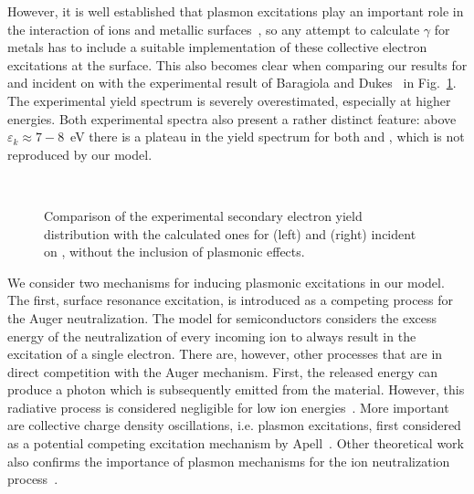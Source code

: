 \begin{refsection}
However, it is well established that plasmon excitations play an important 
role in the interaction of ions and metallic surfaces~\cite{Baragiola1996, 
Baragiola2001, Baragiola2007}, so any attempt to calculate $\gamma$ for metals 
has to include a suitable implementation of these collective electron excitations at
the surface. This also becomes clear when comparing our results 
for  and  incident on  with the experimental 
result of Baragiola and Dukes~\cite{Baragiola1996} in 
Fig.~\ref{quotas:fig-he_mg_noplasmon}. The experimental yield spectrum is 
severely overestimated, especially at higher energies. Both experimental 
spectra also present a rather distinct feature: above $\varepsilon_k \approx 
7-8$~\si{\electronvolt} there is a plateau in the yield spectrum for both 
 and , which is not reproduced by our model. 

\begin{figure}[ht] 
    \centering 
    \captionsetup{width=0.9\textwidth}
    \begin{subfigure}[t]{0.49\textwidth} 
        \centering 
         
        \vspace{-1em} 
        \caption{} 
    \end{subfigure}%
    ~  
    \begin{subfigure}[t]{0.49\textwidth} 
        \centering 
         
        \vspace{-1em} 
        \caption{} 
    \end{subfigure} 
\caption{Comparison of the experimental secondary electron yield distribution 
with the calculated ones for  (left) and  (right) incident on 
, without the inclusion of plasmonic effects.} 
\label{quotas:fig-he_mg_noplasmon} 
\end{figure} 
 
 
We consider two mechanisms for inducing plasmonic excitations in our model. 
The first, surface resonance excitation, is introduced as a competing process 
for the Auger neutralization. The model for semiconductors 
considers the excess energy of the neutralization of every incoming ion to always
result in the excitation of a single electron. There are, however, other 
processes that are in direct competition with the Auger mechanism. First, the 
released energy can produce a photon which is subsequently emitted from the 
material. However, this radiative process is considered negligible for low ion 
energies~\cite{Almulhem1989}. More important are collective charge density 
oscillations, i.e. plasmon excitations, first considered as a potential competing 
excitation mechanism by Apell~\cite{Apell1988}. Other theoretical 
work also confirms the importance of plasmon mechanisms for the ion 
neutralization process~\cite{Almulhem1989, Monreal1995, VicenteAlvarez1998}.  


\end{refsection}
